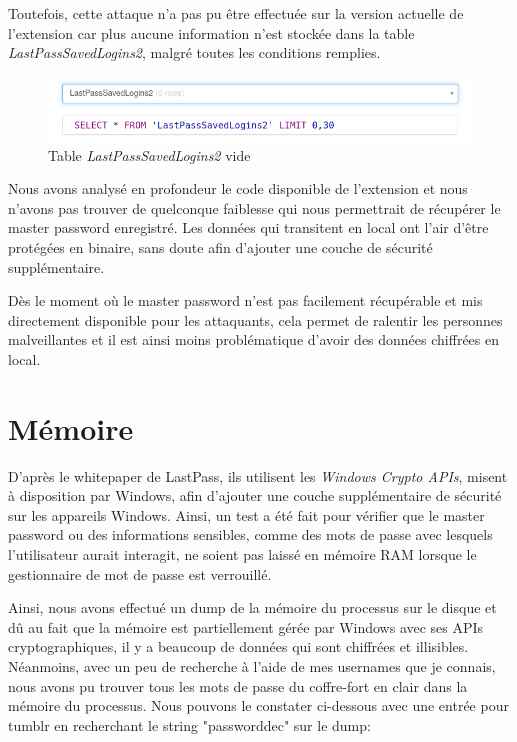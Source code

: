 	Toutefois, cette attaque n'a pas pu être effectuée sur la version actuelle de l'extension car plus aucune information n'est stockée dans la table \textit{LastPassSavedLogins2}, malgré toutes les conditions remplies.
	
	\begin{figure}[H]
		\centering
		\includegraphics[width=15.5cm]{images/sql_lp.png}
		\caption{Table \textit{LastPassSavedLogins2} vide}
	\end{figure} 
	
	Nous avons analysé en profondeur le code disponible de l'extension et nous n'avons pas trouver de quelconque faiblesse qui nous permettrait de récupérer le master password enregistré. Les données qui transitent en local ont l'air d'être protégées en binaire, sans doute afin d'ajouter une couche de sécurité supplémentaire.
	
	Dès le moment où le master password n'est pas facilement récupérable et mis directement disponible pour les attaquants, cela permet de ralentir les personnes malveillantes et il est ainsi moins problématique d'avoir des données chiffrées en local.
\section{Mémoire}
D'après le whitepaper de LastPass, ils utilisent les \textit{Windows Crypto APIs}, misent à disposition par Windows, afin d'ajouter une couche supplémentaire de sécurité sur les appareils Windows. Ainsi, un test a été fait pour vérifier que le master password ou des informations sensibles, comme des mots de passe avec lesquels l'utilisateur aurait interagit, ne soient pas laissé en mémoire RAM lorsque le gestionnaire de mot de passe est verrouillé. 

Ainsi, nous avons effectué un dump de la mémoire du processus sur le disque et dû au fait que la mémoire est partiellement gérée par Windows avec ses APIs cryptographiques, il y a beaucoup de données qui sont chiffrées et illisibles. Néanmoins, avec un peu de recherche à l'aide de mes usernames que je connais, nous avons pu trouver tous les mots de passe du coffre-fort en clair dans la mémoire du processus. Nous pouvons le constater ci-dessous avec une entrée pour tumblr en recherchant le string "passworddec" sur le dump:
 

